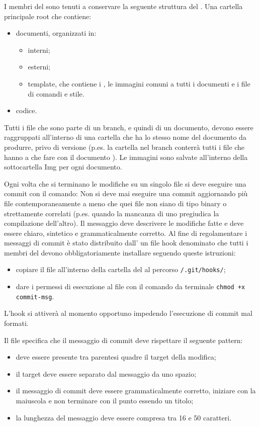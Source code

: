 \documentclass[a4paper, titlepage]{article}
\begin{document}
I membri del  sono tenuti a conservare la seguente struttura del .
Una cartella principale root che contiene:
\begin{itemize}
	\item documenti, organizzati in:
	\begin{itemize}
		\item interni;
		\item esterni;
		\item template, che contiene i , le immagini comuni a tutti i documenti e i file di comandi e stile.
	\end{itemize}
	\item codice.
\end{itemize}
Tutti i file che sono parte di un branch, e quindi di un documento, devono essere raggruppati all'interno di una cartella che ha lo stesso nome del documento da produrre, privo di versione (p.es. la cartella  nel branch  conterrà tutti i file che hanno a che fare con il documento ). Le immagini sono salvate all'interno della sottocartella Img per ogni documento.

Ogni volta che si terminano le modifiche su un singolo file si deve eseguire una commit con il comando:
Non si deve mai eseguire una commit aggiornando più file contemporaneamente a meno che quei file non siano di tipo binary o strettamente correlati (p.es. quando la mancanza di uno pregiudica la compilazione dell'altro). Il messaggio deve descrivere le modifiche fatte e deve essere chiaro, sintetico e grammaticalmente corretto. Al fine di regolamentare i messaggi di commit è stato distribuito dall' un file hook denominato  che tutti i membri del  devono obbligatoriamente installare seguendo queste istruzioni:
\begin{itemize}
	\item copiare il file all'interno della cartella del  al percorso \texttt{/.git/hooks/};
	\item dare i permessi di esecuzione al file con il comando da terminale \texttt{chmod +x commit-msg}.
\end{itemize}
L'hook si attiverà al momento opportuno impedendo l'esecuzione di commit mal formati.

Il file  specifica che il messaggio di commit deve rispettare il seguente pattern:
\begin{itemize}
	\item deve essere presente tra parentesi quadre il target della modifica;
	\item il target deve essere separato dal messaggio da uno spazio;
	\item il messaggio di commit deve essere grammaticalmente corretto, iniziare con la maiuscola e non terminare con il punto essendo un titolo;
	\item la lunghezza del messaggio deve essere compresa tra 16 e 50 caratteri.
\end{itemize}
\end{document}
